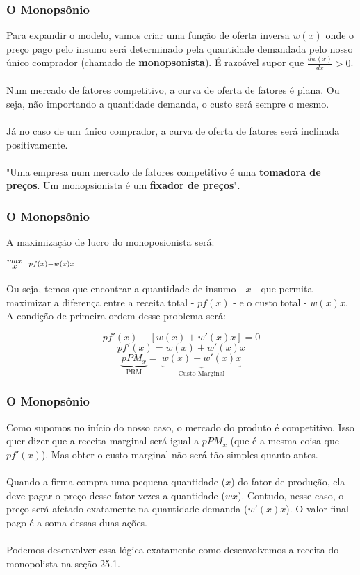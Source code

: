 \documentclass{beamer}[10]
\begin{document}
\begin{frame}
	\frametitle{O Monopsônio}

	Para expandir o modelo, vamos criar uma função de oferta inversa $w(x)$ onde o preço pago pelo insumo será determinado pela quantidade demandada pelo nosso único comprador (chamado de \textbf{monopsonista}). É razoável supor que $\frac{d w(x)}{d x} > 0$.
	\\~\\
	Num mercado de fatores competitivo, a curva de oferta de fatores é plana. Ou seja, não importando a quantidade demanda, o custo será sempre o mesmo. 
	\\~\\
	Já no caso de um único comprador, a curva de oferta de fatores será inclinada positivamente.
	\\~\\
	"Uma empresa num mercado de fatores competitivo é uma \textbf{tomadora de preços}. Um monopsionista é um \textbf{fixador de preços}".

\end{frame}

\begin{frame}
	\frametitle{O Monopsônio}

	A maximização de lucro do monoposionista será:

	\begin{center}
	\LARGE $\stackrel{max}{\text{\small $x$}} \ \ 
	\stackrel{pf(x) - w(x)x}{\ }$ \\
	\end{center}

	Ou seja, temos que encontrar a quantidade de insumo - $x$ - que permita maximizar a diferença entre a receita total - $p f(x)$ - e o custo total - $w(x)x$. A condição de primeira ordem desse problema será:

	$$ pf'(x) - [ w(x) + w'(x)x ] = 0 $$
	$$ pf'(x) = w(x) + w'(x)x $$
	$$ \underbrace{pPM_x}_{\textrm{PRM}} = \ \underbrace{w(x) + w'(x)x}_{\textrm{Custo Marginal}} $$

\end{frame}

\begin{frame}
	\frametitle{O Monopsônio}

	Como supomos no início do nosso caso, o mercado do produto é competitivo. Isso quer dizer que a receita marginal será igual a $pPM_x$ (que é a mesma coisa que $pf'(x)$). Mas obter o custo marginal não será tão simples quanto antes.
	\\~\\
	Quando a firma compra uma pequena quantidade ($x$) do fator de produção, ela deve pagar o preço desse fator vezes a quantidade ($wx$). Contudo, nesse caso, o preço será afetado exatamente na quantidade demanda ($w'(x)x$). O valor final pago é a soma dessas duas ações.
	\\~\\
	Podemos desenvolver essa lógica exatamente como desenvolvemos a receita do monopolista na seção 25.1.

\end{frame}
\end{document}
